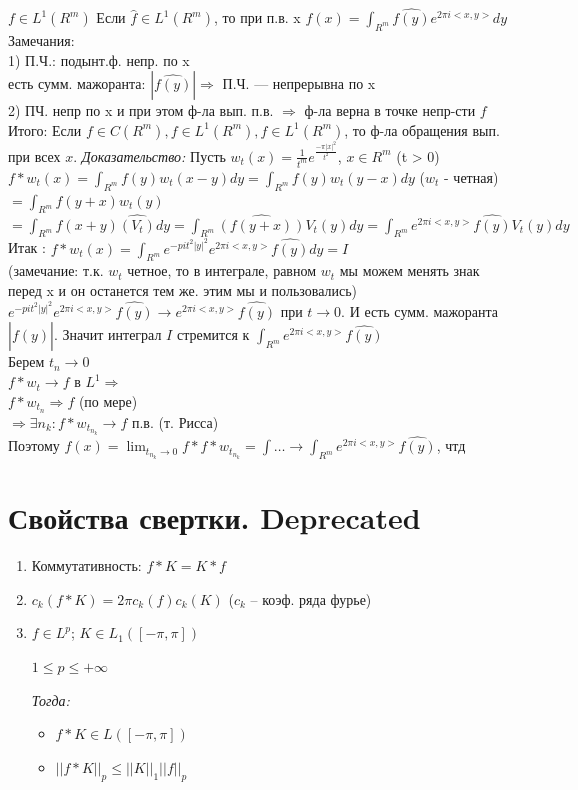 \documentclass[paper=a4, fontsize=17pt]{article}
\begin{document}
$f \in L^1(R^m)$
Если $\hat{f} \in L^1(R^m)$, то при п.в. x $f(x) = \int_{R^m} \hat{f(y)} e^{2\pi i <x, y>} dy$ \\
Замечания: \\
1) П.Ч.: подынт.ф. непр. по x \\
есть сумм. мажоранта: $|\hat{f(y)}| \Rightarrow $ П.Ч. --- непрерывна по x \\
2) ПЧ. непр по x и при этом ф-ла вып. п.в. $\Rightarrow$ ф-ла верна в точке непр-сти $f$ \\
Итого: Если $f \in C(R^m), f \in L^1(R^m), \hat{f} \in L^1(R^m)$, то ф-ла обращения вып. при всех $x$.
\emph{Доказательство:}
Пусть $w_t(x) = \frac{1}{t^m} e^{\frac{-\pi |x|^2}{t^2}}$, $x \in R^m$ (t > 0) \\
$f * w_t(x) = \int_{R^m} f(y) w_t(x-y) dy = \int_{R^m} f(y)w_t(y-x)dy$ ($w_t$ - четная) $ = \int_{R^m}f(y+x)w_t(y)$
$= \int_{R^m} f(x+y) \hat{(V_t)} dy = \int_{R^m} \hat{(f(y+x))} V_t(y) dy = \int_{R^m} e^{2 \pi i <x, y>} \hat{f(y)} V_t(y) dy$\\
Итак : $f * w_t(x) = \int_{R^m} e^{-pi t^2 |y|^2} e^{2 \pi i <x, y>} \hat{f(y)} dy = I$ \\
(замечание: т.к. $w_t$ четное, то в интеграле, равном $w_t$ мы можем менять знак перед x и он останется тем же. этим мы и пользовались) \\
$e^{-pi t^2 |y|^2} e^{2 \pi i <x, y>} \hat{f(y)}  \rightarrow e^{2 \pi i <x, y>} \hat{f(y)}$ при $t \rightarrow 0$. И есть сумм. мажоранта $|\hat{f(y)}|$. Значит интеграл $I$ стремится к $\int_{R^m} e^{2 \pi i <x, y>} \hat{f(y)}$\\
Берем $t_n \rightarrow 0$\\
$f*w_t \rightarrow f$ в $L^1 \Rightarrow $\\
$f*w_{t_n} \Rightarrow f$ (по мере)\\
$\Rightarrow \exists n_k : f*w_{t_{n_k}} \rightarrow f$ п.в. (т. Рисса) \\
Поэтому $f(x) = \lim_{t_{n_k} \rightarrow 0} f*f*w_{t_{n_k}} = \int \dots \rightarrow \int_{R^m} e^{2 \pi i <x, y>} \hat{f(y)}$, чтд


\section{Свойства свертки.  \Large Deprecated}

\begin{enumerate}
	\item Коммутативность: $ f \ast K = K \ast f$
	\item $ c_k(f \ast K) = 2\pi c_k(f) c_k(K) $ ($ c_k $ -- коэф. ряда фурье)
	\item
		$ f \in L^p $; $ K \in L_1( [-\pi, \pi]) $

		$ 1 \leqslant p \leqslant +\infty $

		\emph{Тогда:}
		\begin{itemize}
			\item $ f \ast K \in L([-\pi, \pi]) $
			\item $ ||f \ast K||_{p} \leqslant ||K||_1 ||f||_p $
		\end{itemize}
\end{enumerate}
\end{document}
